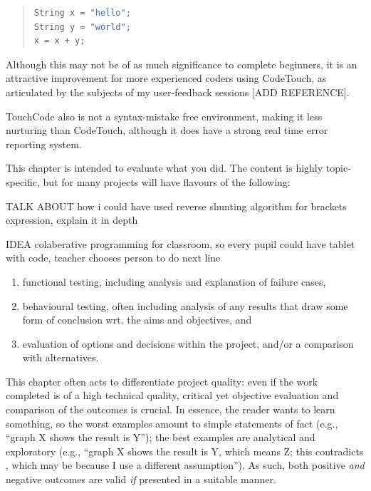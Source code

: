 \documentclass[ %
                    author={Jonathan Rankin},
                supervisor={Dr. David May, Dr. Ian Holyer},
                    degree={MEng},
                     title={CodeTouch},
                  subtitle={A Revolutionary Way To Program Real Code On Touch Screen Devices},
                      type={enterprise},
                      year={2015 } ]{dissertation}
\begin{document}
\begin{enumerate}
\begin{quote}
\begin{lstlisting}[label={lst:python},language=Python]
String x = "hello";
String y = "world";
x = x + y;
\end{lstlisting}
\label{lst:label}
\end{quote}

Although this may not be of as much significance to complete beginners, it is an attractive improvement for more experienced coders using CodeTouch, as articulated by the subjects of my user-feedback sessions [ADD REFERENCE].

TouchCode also is not a syntax-mistake free environment, making it less nurturing than CodeTouch, although it does have a strong real time error reporting system.








This chapter is intended to evaluate what you did.  The content is highly 
topic-specific, but for many projects will have flavours of the following:

TALK ABOUT how i could have used reverse shunting algorithm for brackets expression, explain it in depth

IDEA colaberative programming for classroom, so every pupil could have tablet with code, teacher chooses person to do next line

\begin{enumerate}
\item functional  testing, including analysis and explanation of failure 
      cases,
\item behavioural testing, often including analysis of any results that 
      draw some form of conclusion wrt. the aims and objectives,
      and
\item evaluation of options and decisions within the project, and/or a
      comparison with alternatives.
\end{enumerate}



\noindent
This chapter often acts to differentiate project quality: even if the work
completed is of a high technical quality, critical yet objective evaluation 
and comparison of the outcomes is crucial.  In essence, the reader wants to
learn something, so the worst examples amount to simple statements of fact 
(e.g., ``graph X shows the result is Y''); the best examples are analytical 
and exploratory (e.g., ``graph X shows the result is Y, which means Z; this 
contradicts , which may be because I use a different assumption'').  As 
such, both positive {\em and} negative outcomes are valid {\em if} presented 
in a suitable manner.


\end{enumerate}
\end{document}
